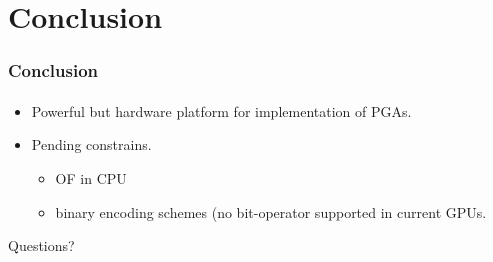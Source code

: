 \section{Conclusion}
\frame
{
\frametitle{Conclusion}
\framesubtitle{}
\begin{itemize}
	\item Powerful but  hardware platform for implementation of PGAs.
	\item Pending constrains.
	\begin{itemize}
		\item OF in CPU
		\item binary encoding schemes  (no bit-operator supported in current GPUs.
	\end{itemize}
\end{itemize}
}

\frame
{
\vspace{1cm}
\begin{center}
	\Large Questions?
\end{center}

}
